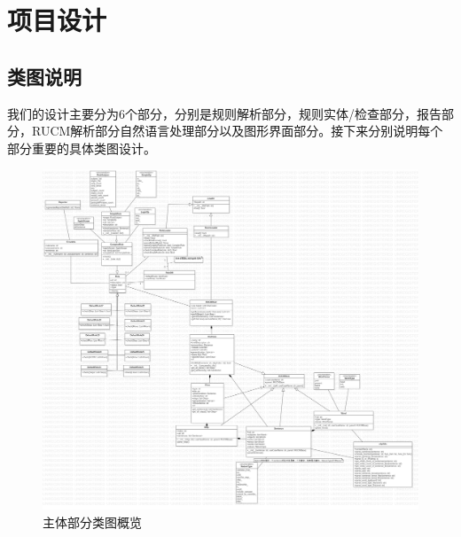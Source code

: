\chapter{项目设计}

\section{类图说明}



	我们的设计主要分为6个部分，分别是规则解析部分，规则实体/检查部分，报告部分，RUCM解析部分自然语言处理部分以及图形界面部分。接下来分别说明每个部分重要的具体类图设计。
		\begin{figure}
		\centering
		\includegraphics[width=1\textwidth]{./src/classDiagram_overview.jpg} 
		\caption{主体部分类图概览} 
		\label{key}
	\end{figure}

